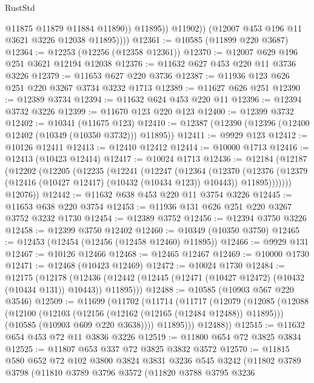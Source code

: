 \begin{lexlean}{RustStd}
\begin{coremodule}
{\begin{coremodule}
{{{{{{{{{{{{{{{{{{{{{{{{{                      @11875
                      @11879
                      @11884
                      @11890))
                  @11895))
              @11902))
          (@12007 @453 @196 @11 @3621 @3226 @12038 @11895))))
@12361 := @10585 (@11899 @220 @3687)
@12364 := @12253 (@12256 (@12358 @12361))
@12370 := @12007 @629 @196 @251 @3621 @12194 @12038
@12376 := @11632 @627 @453 @220 @11 @3736 @3226
@12379 := @11653 @627 @220 @3736
@12387 := @11936 @123 @626 @251 @220 @3267 @3734 @3232 @1713
@12389 := @11627 @626 @251
@12390 := @12389 @3734
@12394 := @11632 @624 @453 @220 @11
@12396 := @12394 @3732 @3226
@12399 := @11670 @123 @220 @123
@12400 := @12399 @3732
@12402 := @10341 (@11675 @123)
@12410 := @12387 (@12390 (@12396 (@12400 @12402 (@10349 (@10350 @3732))) @11895))
@12411 := @9929 @123
@12412 := @10126 @12411
@12413 := @12410 @12412
@12414 := @10000 @1713
@12416 := @12413 (@10423 @12414)
@12417 := @10024 @1713
@12436 := @12184
    (@12187
      (@12202
        (@12205
          (@12235
            (@12241
              (@12247
                (@12364
                  (@12370
                    (@12376
                      (@12379 (@12416 (@10427 @12417) (@10432 (@10434 @123)) @10443))
                      @11895)))))))
        @12076))
@12442 := @11632 @638 @453 @220 @11 @3754 @3226
@12445 := @11653 @638 @220 @3754
@12453 := @11936 @131 @626 @251 @220 @3267 @3752 @3232 @1730
@12454 := @12389 @3752
@12456 := @12394 @3750 @3226
@12458 := @12399 @3750 @12402
@12460 := @10349 (@10350 @3750)
@12465 := @12453 (@12454 (@12456 (@12458 @12460) @11895))
@12466 := @9929 @131
@12467 := @10126 @12466
@12468 := @12465 @12467
@12469 := @10000 @1730
@12471 := @12468 (@10423 @12469)
@12472 := @10024 @1730
@12484 := @12175
    (@12178
      (@12436 (@12442 (@12445 (@12471 (@10427 @12472) (@10432 (@10434 @131)) @10443)) @11895)))
@12488 := @10585 (@10903 @567 @220 @3546)
@12509 := @11699
    (@11702
      (@11714
        (@11717
          (@12079
            (@12085
              (@12088
                (@12100
                  (@12103 (@12156 (@12162 (@12165 (@12484 @12488)) @11895)))
                  (@10585 (@10903 @609 @220 @3638))))
              @11895)))
        @12488))
@12515 := @11632 @654 @453 @72 @11 @3836 @3226
@12519 := @11800 @654 @72 @3825 @3834
@12525 := @11807 @653 @337 @72 @3825 @3832 @3572
@12570 := @11815
    @580
    @652
    @72
    @102
    @3800
    @3824
    @3831
    @3236
    @545
    @3242
    (@11802
      @3789
      @3798
      (@11810
        @3789
        @3796
        @3572
        (@11820
          @3788
          @3795
          @3236
}}}}}}}}}}}}}}}}}}}}}}}}}
\end{coremodule}}
\end{coremodule}
\end{lexlean}
